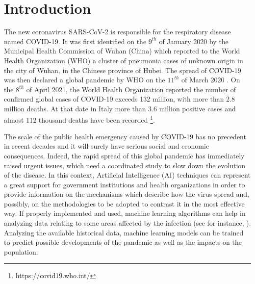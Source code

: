 \documentclass[review]{elsarticle}
\begin{document}

\section{Introduction}
The new coronavirus SARS-CoV-2 is responsible for the respiratory disease named COVID-19. It was first identified on the $9^{th}$ of January 2020 by the Municipal Health Commission of Wuhan (China) which reported to the World Health Organization (WHO) a cluster of pneumonia cases of unknown origin in the city of Wuhan, in the Chinese province of Hubei. The spread of COVID-19 was then declared a global pandemic by WHO on  the $11^{th}$ of March 2020 \cite{world2020director}. On the $8^{th}$ of April 2021, the World Health Organization reported the number of confirmed global cases of COVID-19 exceeds 132 million, with more than 2.8 million deaths. At that date in Italy more than 3.6 million positive cases and almost 112 thousand deaths have been recorded \footnote{https://covid19.who.int/}.

The scale of the public health emergency caused by COVID-19 has no precedent in recent decades and it will surely have serious social and economic consequences. Indeed, the rapid spread of this global pandemic has immediately raised urgent issues, which need a coordinated study to slow down the evolution of the disease. In this context, Artificial Intelligence (AI) techniques can represent a great support for government institutions and health organizations in order to provide information on the mechanisms which describe how the virus spread and, possibly, on the methodologies to be adopted to contrast it in the most effective way. If properly implemented and used, machine learning algorithms can help in analyzing data relating to some areas affected by the infection (see for instance, \cite{vaishya2020artificial,jamshidi2020artificial,lalmuanawma2020applications}). Analyzing the available historical data,  machine learning models can be trained to predict possible developments of the pandemic as well as the  impacts on the population.
\end{document}
